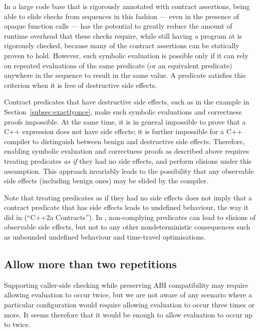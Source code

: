 In a large code base that is rigorously annotated with contract assertions, being able to elide checks from sequences in this fashion --- even in the presence of opaque function calls --- has the potential to greatly reduce the amount of runtime overhead that these checks require, while still having a program at is rigorously checked, because many of the contract assertions can be statically proven to hold. However, such symbolic evaluation is possible only if it can rely on repeated evaluations of the same predicate (or an equivalent predicate) anywhere in the sequence to result in the same value. A predicate satisfies this criterion when it is free of destructive side effects.

Contract predicates that have destructive side effects, such as in the  example in Section~\ref{subsec:exactlyonce}, make such symbolic evaluations and correctness proofs impossible. At the same time, it is in general impossible to prove that a C++ expression does not have side effects; it is further impossible for a C++ compiler to distinguish between benign and destructive side effects. Therefore, enabling symbolic evaluation and correctness proofs as described above requires treating predicates \emph{as if} they had no side effects, and perform elisions under this assumption. This approach invariably leads to the possibility that any observable side effects (including benign ones) may be elided by the compiler.

Note that treating predicates as if they had no side effects does not imply that a contract predicate that has side effects leads to undefined behaviour, the way it did in \cite{P0542R5} (``C++2a Contracts''). In \cite{P2900R6}, non-complying predicates can lead to elisions of observable side effects, but not to any other nondeterministic consequences such as unbounded undefined behaviour and time-travel optimisations.

\subsection{Allow more than two repetitions}
\label{subsec:rep}

Supporting caller-side checking while preserving ABI compatibility may require allowing evaluation to occur twice, but we are not aware of any scenario where a particular configuration would require allowing evaluation to occur three times or more. It seems therefore that it would be enough to allow evaluation to occur up to twice.

